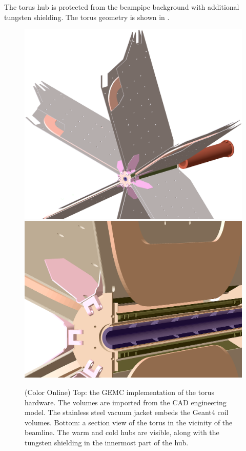 The torus hub is protected from the beampipe background with additional tungsten shielding.
The torus geometry is shown in .

\begin{figure}
	\centering
	\includegraphics[width=0.99\columnwidth,keepaspectratio]{img/torusGeometry.png}
	\includegraphics[width=0.99\columnwidth,keepaspectratio]{img/torusDetail.png}
	\caption{(Color Online) Top: the GEMC implementation of the torus hardware. The volumes are imported from the CAD engineering model.
             The stainless steel vacuum jacket embeds the Geant4 coil volumes.
			 Bottom: a section view of the torus in the vicinity of the beamline. The warm and cold hubs are visible, along with the
			 tungsten shielding in the innermost part of the hub.}
	\label{fig:torus}
\end{figure}


